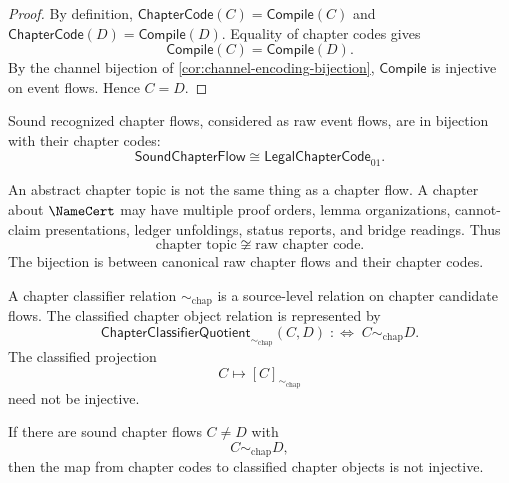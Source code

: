 \begin{proof}
By definition, $\mathsf{ChapterCode}(C)=\mathsf{Compile}(C)$ and $\mathsf{ChapterCode}(D)=\mathsf{Compile}(D)$. Equality of chapter codes gives
$$
  \mathsf{Compile}(C)=\mathsf{Compile}(D).
$$
By the channel bijection of \autoref{cor:channel-encoding-bijection}, $\mathsf{Compile}$ is injective on event flows. Hence $C=D$.
\end{proof}

\begin{corollary}
\label{cor:chapter-generated-flow-code-bijective}
Sound recognized chapter flows, considered as raw event flows, are in bijection with their chapter codes:
$$
  \mathsf{SoundChapterFlow}
  \cong
  \mathsf{LegalChapterCode}_{01}.
$$
\end{corollary}

\begin{remark}
\label{rem:chapter-generated-topic-not-flow}
An abstract chapter topic is not the same thing as a chapter flow. A chapter about $\NameCert$ may have multiple proof orders, lemma organizations, cannot-claim presentations, ledger unfoldings, status reports, and bridge readings. Thus
$$
  \text{chapter topic}
  \not\cong
  \text{raw chapter code}.
$$
The bijection is between canonical raw chapter flows and their chapter codes.
\end{remark}

\begin{definition}
\label{def:chapter-generated-classifier-quotient}
A chapter classifier relation $\sim_{\mathrm{chap}}$ is a source-level relation on chapter candidate flows. The classified chapter object relation is represented by
$$
  \mathsf{ChapterClassifierQuotient}_{\sim_{\mathrm{chap}}}(C,D)
  \;:\Longleftrightarrow\;
  C\sim_{\mathrm{chap}}D.
$$
The classified projection
$$
  C\longmapsto [C]_{\sim_{\mathrm{chap}}}
$$
need not be injective.
\end{definition}

\begin{proposition}
\label{prop:chapter-generated-classified-not-code-bijective}
If there are sound chapter flows $C\neq D$ with
$$
  C\sim_{\mathrm{chap}} D,
$$
then the map from chapter codes to classified chapter objects is not injective.
\end{proposition}


